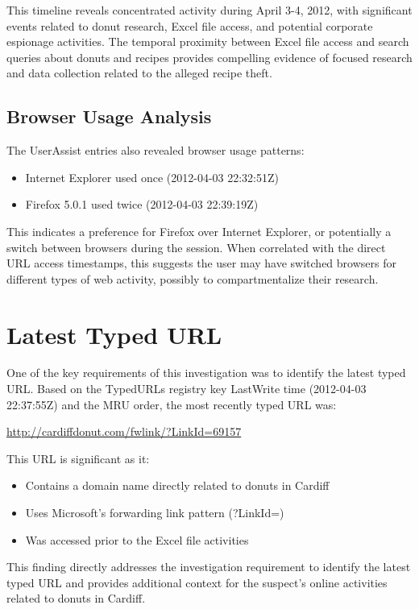 This timeline reveals concentrated activity during April 3-4, 2012, with significant events related to donut research, Excel file access, and potential corporate espionage activities. The temporal proximity between Excel file access and search queries about donuts and recipes provides compelling evidence of focused research and data collection related to the alleged recipe theft.

\subsection{Browser Usage Analysis}
The UserAssist entries also revealed browser usage patterns:

\begin{itemize}
    \item Internet Explorer used once (2012-04-03 22:32:51Z)
    \item Firefox 5.0.1 used twice (2012-04-03 22:39:19Z)
\end{itemize}

This indicates a preference for Firefox over Internet Explorer, or potentially a switch between browsers during the session. When correlated with the direct URL access timestamps, this suggests the user may have switched browsers for different types of web activity, possibly to compartmentalize their research.

\section{Latest Typed URL}
One of the key requirements of this investigation was to identify the latest typed URL. Based on the TypedURLs registry key LastWrite time (2012-04-03 22:37:55Z) and the MRU order, the most recently typed URL was:


\url{http://cardiffdonut.com/fwlink/?LinkId=69157}


This URL is significant as it:
\begin{itemize}
    \item Contains a domain name directly related to donuts in Cardiff
    \item Uses Microsoft's forwarding link pattern (?LinkId=)
    \item Was accessed prior to the Excel file activities
\end{itemize}

This finding directly addresses the investigation requirement to identify the latest typed URL and provides additional context for the suspect's online activities related to donuts in Cardiff.

